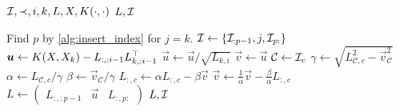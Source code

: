 \begin{algorithmic}[1]
  \REQUIRE \( \mathcal{I}, \prec, i, k, L, X, K(\cdot, \cdot) \)
  \ENSURE \( L, \mathcal{I} \)

  \STATE Find \( p \) by \cref{alg:insert_index} for \( j = k \).
  \STATE \( \mathcal{I} \gets \{ \mathcal{I}_{:p - 1}, j, \mathcal{I}_{p:} \} \)
  \STATE \( \bm{u} \gets K(X, X_k) - L_{:, :i - 1} L_{k, :i - 1}^{\top} \)
  \STATE \( \vec{u} \gets \vec{u}/\sqrt{L_{k, i}} \)
  \STATE \( \vec{v} \gets \vec{u} \)
    \STATE \( \mathcal{C} \gets \mathcal{I}_c \)
    \STATE \( \gamma \gets
      \sqrt{L_{\mathcal{C}, c}^2 - \vec{v}_{\mathcal{C}}^2}
    \)
    \STATE \( \alpha \gets  L_{\mathcal{C}, c}/\gamma \)
    \STATE \( \beta \gets \vec{v}_{\mathcal{C}}/\gamma \)
    \STATE \( L_{:, c} \gets \alpha L_{:, c} - \beta \vec{v} \)
    \STATE \( \vec{v} \gets
      \frac{1}{\alpha} \vec{v} - \frac{\beta}{\alpha} L_{:, c}
    \)
  \ENDFOR
  \STATE \( L \gets
    \begin{pmatrix}
      L_{:, :p - 1} & \vec{u} & L_{:, p:}
    \end{pmatrix}
  \)
  \RETURN \( L, \mathcal{I} \)
\end{algorithmic}
